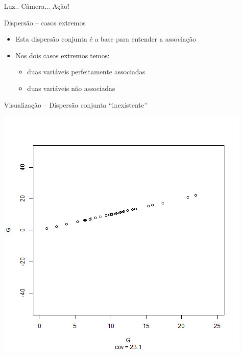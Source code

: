 \documentclass{beamer}
\begin{document}
\begin{frame}{\scriptsize Luz.. Câmera... Ação!}
  \begin{center}
  \end{center}
\end{frame}

\begin{frame}{\scriptsize Dispersão -- casos extremos}
  \begin{itemize}
    \footnotesize
  \item Esta dispersão conjunta é a base para entender a associação
    \bigskip
  \item Nos dois casos extremos temos:
    \begin{itemize}
      \scriptsize
    \item duas variáveis perfeitamente associadas
    \item duas variáveis não associadas
    \end{itemize}
  \end{itemize}
\end{frame}

\begin{frame}{\scriptsize Visualização -- Dispersão conjunta ``inexistente''}
  \begin{center}
    \includegraphics[height=.8\textheight]{Cap17/anim-0}
  \end{center}
\end{frame}
\end{document}
